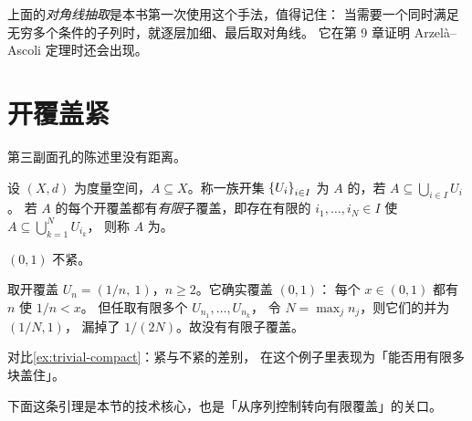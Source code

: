 \begin{remark}
  上面的\emph{对角线抽取}是本书第一次使用这个手法，值得记住：
  当需要一个同时满足无穷多个条件的子列时，就逐层加细、最后取对角线。
  它在第 9 章证明 Arzelà--Ascoli 定理时还会出现。
\end{remark}

\section{开覆盖紧}
\label{sec:open-cover}

第三副面孔的陈述里没有距离。

\begin{definition}[开覆盖与紧]
  \label{def:compact}
  设 \((X,d)\) 为度量空间，\(A \subseteq X\)。称一族开集 \(\left\{U_{i}\right\}_{i \in I}\)
  为 \(A\) 的，若 \(A \subseteq \bigcup_{i \in I} U_{i}\)。
  若 \(A\) 的每个开覆盖都有\emph{有限}子覆盖，即存在有限的
  \(i_{1},\dots,i_{N} \in I\) 使 \(A \subseteq \bigcup_{k=1}^{N} U_{i_{k}}\)，
  则称 \(A\) 为。
\end{definition}

\begin{example}
  \label{ex:not-compact-cover}
  \((0,1)\) 不紧。
  \begin{worked}
    取开覆盖 \(U_{n} = (1/n,\ 1)\)，\(n \ge 2\)。它确实覆盖 \((0,1)\)：
    每个 \(x \in (0,1)\) 都有 \(n\) 使 \(1/n < x\)。
    但任取有限多个 \(U_{n_{1}},\dots,U_{n_{k}}\)，
    令 \(N = \max_{j} n_{j}\)，则它们的并为 \((1/N,1)\)，
    漏掉了 \(1/(2N)\)。故没有有限子覆盖。

    对比\cref{ex:trivial-compact}：紧与不紧的差别，
    在这个例子里表现为「能否用有限多块盖住」。
  \end{worked}
\end{example}

下面这条引理是本节的技术核心，也是「从序列控制转向有限覆盖」的关口。

